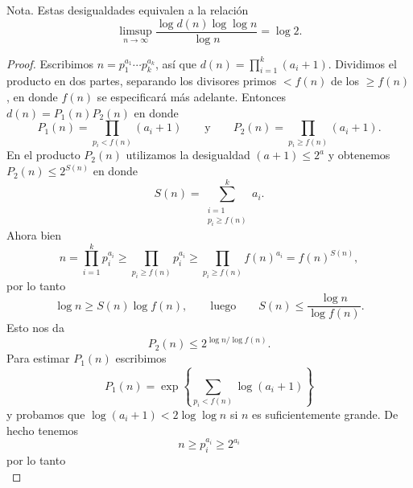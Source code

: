 \documentclass[12pt,a4paper]{book}
\begin{document}
    Nota. Estas desigualdades equivalen a la relación
    \begin{equation*}
        \limsup_{n\to\infty}\frac{\log d(n)\log\log n}{\log n}=\log2.
    \end{equation*}

    \begin{proof}
        Escribimos $n=p_{1}^{a_{1}}\cdots p_{k}^{a_{k}}$, así que $d(n)=\prod_{i=1}^{k}(a_{i}+1)$.
        Dividimos el producto en dos partes, separando los divisores primos $<f(n)$ de los
        $\geq f(n)$, en donde $f(n)$ se especificará más adelante. Entonces
        $d(n)=P_{1}(n)P_{2}(n)$ en donde
        \begin{equation*}
            P_{1}(n)=\prod_{p_{i}<f(n)}(a_{i}+1)\qquad\text{y}\qquad P_{2}(n)=\prod_{p_{i}\geq f(n)}(a_{i}+1).
        \end{equation*}
        En el producto $P_{2}(n)$ utilizamos la desigualdad $(a+1)\leq2^{a}$ y obtenemos
        $P_{2}(n)\leq2^{S(n)}$ en donde
        \begin{equation*}
            S(n)=\sum_{\substack{i=1\\p_{i}\geq f(n)}}^{k}a_{i}.
        \end{equation*}
        Ahora bien
        \begin{equation*}
            n=\prod_{i=1}^{k}p_{i}^{a_{i}}\geq\prod_{p_{i}\geq f(n)}p_{i}^{a_{i}}\geq\prod_{p_{i}\geq f(n)}f(n)^{a_{i}}=f(n)^{S(n)},
        \end{equation*}
        por lo tanto
        \begin{equation*}
            \log n\geq S(n)\log f(n),\qquad\text{luego}\qquad S(n)\leq\frac{\log n}{\log f(n)}.
        \end{equation*}
        Esto nos da
        \begin{equation}\label{eq:13-29}
            P_{2}(n)\leq2^{\log n/\log f(n)}.
        \end{equation}
        Para estimar $P_{1}(n)$ escribimos
        \begin{equation*}
            P_{1}(n)=\exp\left\{\sum_{p_{i}<f(n)}\log(a_{i}+1)\right\}
        \end{equation*}
        y probamos que $\log(a_{i}+1)<2\log\log n$ si $n$ es suficientemente grande. De hecho
        tenemos
        \begin{equation*}
            n\geq p_{i}^{a_{i}}\geq2^{a_{i}}
        \end{equation*}
        por lo tanto
        \begin{equation*}

\end{equation*}
\end{proof}
\end{document}
